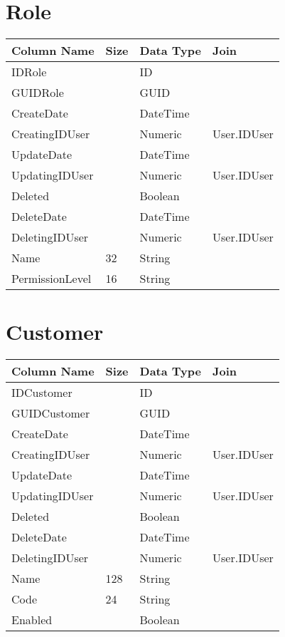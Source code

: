 \section{Role}
\begin{small}
\begin{tabular}{ p{5cm} p{1cm} p{3cm}  p{3.75cm} }
\textbf{Column Name} & \textbf{Size} & \textbf{Data Type} & \textbf{Join} \\ \hline 
IDRole &  & ID &  \\ 
GUIDRole &  & GUID &  \\ 
CreateDate &  & DateTime &  \\ 
CreatingIDUser &  & Numeric & User.IDUser \\ 
UpdateDate &  & DateTime &  \\ 
UpdatingIDUser &  & Numeric & User.IDUser \\ 
Deleted &  & Boolean &  \\ 
DeleteDate &  & DateTime &  \\ 
DeletingIDUser &  & Numeric & User.IDUser \\ 
Name & 32 & String &  \\ 
PermissionLevel & 16 & String &  \\ 
\end{tabular}
\end{small}

\section{Customer}
\begin{small}
\begin{tabular}{ p{5cm} p{1cm} p{3cm}  p{3.75cm} }
\textbf{Column Name} & \textbf{Size} & \textbf{Data Type} & \textbf{Join} \\ \hline 
IDCustomer &  & ID &  \\ 
GUIDCustomer &  & GUID &  \\ 
CreateDate &  & DateTime &  \\ 
CreatingIDUser &  & Numeric & User.IDUser \\ 
UpdateDate &  & DateTime &  \\ 
UpdatingIDUser &  & Numeric & User.IDUser \\ 
Deleted &  & Boolean &  \\ 
DeleteDate &  & DateTime &  \\ 
DeletingIDUser &  & Numeric & User.IDUser \\ 
Name & 128 & String &  \\ 
Code & 24 & String &  \\ 
Enabled &  & Boolean &  \\ 
\end{tabular}
\end{small}

